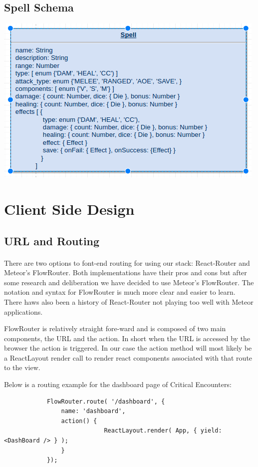 \documentclass[12pt,a4paper]{report}
\begin{document}
		\subsection {Spell Schema}
			\includegraphics[scale=.75]{schema-spell}

\newpage
\section{Client Side Design}
	\subsection{URL and Routing}
		\paragraph {} There are two options to font-end routing for using our stack: React-Router and Meteor's FlowRouter. Both implementations have their pros and cons but after some research and deliberation we have decided to use Meteor's FlowRouter. The notation and syntax for FlowRouter is much more clear and easier to learn. There haws also been a history of React-Router not playing too well with Meteor applications. 
		
		FlowRouter is relatively straight fore-ward and is composed of two main components, the URL and the action. In short when the URL is accessed by the browser the action is triggered. In our case the action method will most likely be a ReactLayout render call to render react components associated with that route to the view. 
		
		Below is a routing example for the dashboard page of Critical Encounters:
		
		\begin{lstlisting}
			FlowRouter.route( '/dashboard', {
				name: 'dashboard',
				action() {
							ReactLayout.render( App, { yield: <DashBoard /> } );
				}
			});
		\end{lstlisting}
		
\end{document}

